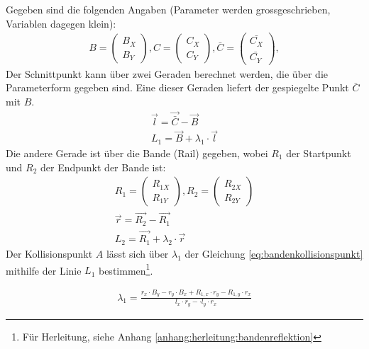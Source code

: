Gegeben sind die folgenden Angaben (Parameter werden grossgeschrieben, Variablen dagegen klein):
\begin{align}
    B = \begin{pmatrix}B_X\\B_Y\end{pmatrix},
    C = \begin{pmatrix}C_X\\C_Y\end{pmatrix},
    \bar{C} = \begin{pmatrix}\bar{C_X}\\\bar{C_Y}\end{pmatrix},
\end{align}
Der Schnittpunkt kann über zwei Geraden berechnet werden, die über die Parameterform gegeben sind.
Eine dieser Geraden liefert der gespiegelte Punkt $\bar{C}$ mit $B$.
\begin{align}
    \vec{l} = \vec{\bar{C}} - \vec{B}\\
    L_1 = \vec{B} + \lambda_1 \cdot \vec{l}
\end{align}
Die andere Gerade ist über die Bande (Rail) gegeben, wobei $R_1$ der Startpunkt und $R_2$ der Endpunkt der Bande ist:
\begin{align}
    R_1 = \begin{pmatrix}R_{1X}\\R_{1Y}\end{pmatrix}, R_2 = \begin{pmatrix}R_{2X}\\R_{2Y}\end{pmatrix}\\
    \vec{r} = \vec{R_2} - \vec{R_1}\\
    L_2 = \vec{R_1} + \lambda_2 \cdot \vec{r}
\end{align}
Der Kollisionspunkt $A$ lässt sich über $\lambda_1$ der Gleichung \ref{eq:bandenkollisionspunkt} mithilfe der Linie $L_1$
bestimmen\footnote{Für Herleitung, siehe Anhang \ref{anhang:herleitung:bandenreflektion}}.

\begin{align}
    \lambda_1 = \frac{r_x \cdot B_y - r_y \cdot B_x + R_{1,x} \cdot r_y - R_{1,y} \cdot r_x}{l_x \cdot r_y - \cdot l_y \cdot r_x}\label{eq:bandenkollisionspunkt}
\end{align}

